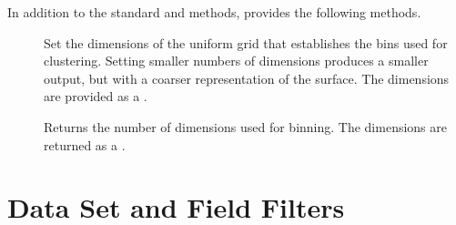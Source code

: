In addition to the standard  and
 methods, 
provides the following methods.

\begin{description}
\item[] Set the dimensions of the uniform
  grid that establishes the bins used for clustering. Setting smaller
  numbers of dimensions produces a smaller output, but with a coarser
  representation of the surface. The dimensions are provided as a
  .
\item[] Returns the number of dimensions
  used for binning. The dimensions are returned as a .
\end{description}



\section{Data Set and Field Filters}




